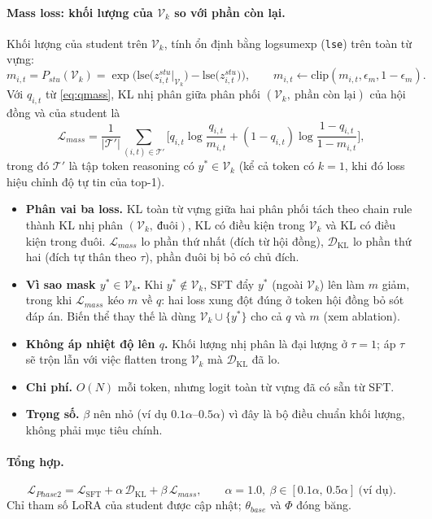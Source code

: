 \documentclass[12pt,a4paper]{article}
\theoremstyle{plain}
\DeclareMathOperator{\KL}{KL}
\newcommand{\Vk}{\mathcal V_k}
\newcommand{\ytar}{y^{*}}
\begin{document}
\paragraph{Mass loss: khối lượng của $\Vk$ so với phần còn lại.}
Khối lượng của student trên $\Vk$, tính ổn định bằng logsumexp (\texttt{lse}) trên toàn từ vựng:
\begin{equation}
\label{eq:mstu}
m_{i,t}=P_{stu}(\Vk)=\exp\!\Big(\mathrm{lse}\big(z^{stu}_{i,t}\big|_{\Vk}\big)-\mathrm{lse}\big(z^{stu}_{i,t}\big)\Big),\qquad m_{i,t}\leftarrow\mathrm{clip}(m_{i,t},\epsilon_m,1-\epsilon_m).
\end{equation}
Với $q_{i,t}$ từ \eqref{eq:qmass}, KL nhị phân giữa phân phối $(\Vk,\ \text{phần còn lại})$ của hội đồng và của student là
\begin{equation}
\label{eq:mass}
\mathcal L_{mass}=\frac1{|\mathcal T'|}\sum_{(i,t)\in\mathcal T'}\Big[q_{i,t}\log\frac{q_{i,t}}{m_{i,t}}+(1-q_{i,t})\log\frac{1-q_{i,t}}{1-m_{i,t}}\Big],
\end{equation}
trong đó $\mathcal T'$ là tập token reasoning có $\ytar\in\Vk$ (kể cả token có $k=1$, khi đó loss hiệu chỉnh độ tự tin của top-1).
\begin{itemize}
\item \textbf{Phân vai ba loss.} KL toàn từ vựng giữa hai phân phối tách theo chain rule thành KL nhị phân $(\Vk,\ \text{đuôi})$, KL có điều kiện trong $\Vk$ và KL có điều kiện trong đuôi. $\mathcal L_{mass}$ lo phần thứ nhất (đích từ hội đồng), $\mathcal D_{\KL}$ lo phần thứ hai (đích tự thân theo $\tau$), phần đuôi bị bỏ có chủ đích.
\item \textbf{Vì sao mask $\ytar\in\Vk$.} Khi $\ytar\notin\Vk$, SFT đẩy $\ytar$ (ngoài $\Vk$) lên làm $m$ giảm, trong khi $\mathcal L_{mass}$ kéo $m$ về $q$: hai loss xung đột đúng ở token hội đồng bỏ sót đáp án. Biến thể thay thế là dùng $\Vk\cup\{\ytar\}$ cho cả $q$ và $m$ (xem ablation).
\item \textbf{Không áp nhiệt độ lên $q$.} Khối lượng nhị phân là đại lượng ở $\tau=1$; áp $\tau$ sẽ trộn lẫn với việc flatten trong $\Vk$ mà $\mathcal D_{\KL}$ đã lo.
\item \textbf{Chi phí.} $O(N)$ mỗi token, nhưng logit toàn từ vựng đã có sẵn từ SFT.
\item \textbf{Trọng số.} $\beta$ nên nhỏ (ví dụ $0.1\alpha$--$0.5\alpha$) vì đây là bộ điều chuẩn khối lượng, không phải mục tiêu chính.
\end{itemize}

\paragraph{Tổng hợp.}
\begin{equation}
\label{eq:phase2_total_loss}
\mathcal L_{Phase2}=\mathcal L_{\mathrm{SFT}}+\alpha\,\mathcal D_{\KL}+\beta\,\mathcal L_{mass},\qquad \alpha=1.0,\ \beta\in[0.1\alpha,\,0.5\alpha]\ \text{(ví dụ)}.
\end{equation}
Chỉ tham số LoRA của student được cập nhật; $\theta_{base}$ và $\Phi$ đóng băng.
\end{document}
